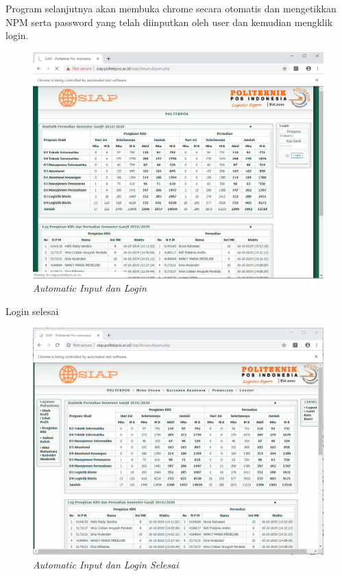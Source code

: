 Program selanjutnya akan membuka chrome secara otomatis dan mengetikkan NPM serta password yang telah diinputkan oleh user dan kemudian mengklik login.
\begin{figure}[H]
    \centering
    \includegraphics[scale=0.5]{figures/isi}
    \caption{\textit{Automatic Input dan Login}}
    \label{Automatic3}
\end{figure}
Login selesai
\begin{figure}[H]
    \centering
    \includegraphics[scale=0.5]{figures/loginselesai}
    \caption{\textit{Automatic Input dan Login Selesai}}
    \label{Automatic4}
\end{figure}


